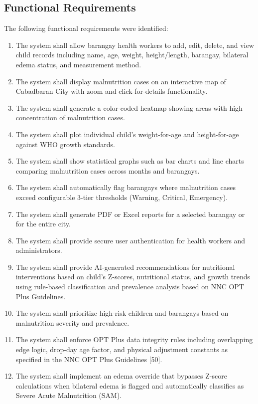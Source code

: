 \documentclass[12pt, a4paper]{report}
\begin{document}
\subsection{Functional Requirements}
\label{subsec:functional}
The following functional requirements were identified:
\begin{enumerate}
    \item The system shall allow barangay health workers to add, edit, delete, and view child records including name, age, weight, height/length, barangay, bilateral edema status, and measurement method.
    \item The system shall display malnutrition cases on an interactive map of Cabadbaran City with zoom and click-for-details functionality.
    \item The system shall generate a color-coded heatmap showing areas with high concentration of malnutrition cases.
    \item The system shall plot individual child's weight-for-age and height-for-age against WHO growth standards.
    \item The system shall show statistical graphs such as bar charts and line charts comparing malnutrition cases across months and barangays.
    \item The system shall automatically flag barangays where malnutrition cases exceed configurable 3-tier thresholds (Warning, Critical, Emergency).
    \item The system shall generate PDF or Excel reports for a selected barangay or for the entire city.
    \item The system shall provide secure user authentication for health workers and administrators.
    \item The system shall provide AI-generated recommendations for nutritional interventions based on child's Z-scores, nutritional status, and growth trends using rule-based classification and prevalence analysis based on NNC OPT Plus Guidelines.
    \item The system shall prioritize high-risk children and barangays based on malnutrition severity and prevalence.
    \item The system shall enforce OPT Plus data integrity rules including overlapping edge logic, drop-day age factor, and physical adjustment constants as specified in the NNC OPT Plus Guidelines [50].
    \item The system shall implement an edema override that bypasses Z-score calculations when bilateral edema is flagged and automatically classifies as Severe Acute Malnutrition (SAM).
\end{enumerate}
\end{document}
